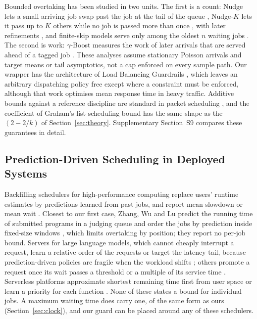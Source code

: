 Bounded overtaking has been studied in two units. The first is a count: Nudge lets a small
arriving job swap past the job at the tail of the queue \cite{grosof2021nudge}, Nudge-$K$
lets it pass up to $K$ others while no job is passed more than once
\cite{vanhoudt2022nudgek}, with later refinements \cite{charlet2026nudgestarm}, and finite-skip models serve only among
the oldest $n$ waiting jobs \cite{grosof2022wcfs}. The second is work: $\gamma$-Boost
measures the work of later arrivals that are served ahead of a tagged job
\cite{yu2024boost,yu2025twotraffics}. These analyses assume stationary Poisson arrivals and
target means or tail asymptotics, not a cap enforced on every sample path. Our wrapper has
the architecture of Load Balancing Guardrails \cite{grosof2019guardrails}, which leaves an
arbitrary dispatching policy free except where a constraint must be enforced, although
that work optimises mean response time in heavy traffic. Additive bounds against a
reference discipline are standard in packet scheduling
\cite{demers1989fq,parekh1993gps,bennett1996wf2q,stoica1995eevdf}, and the coefficient of
Graham's list-scheduling bound \cite{graham1969bounds} has the same shape as the $(2-2/k)$
of Section~\ref{sec:theory}. Supplementary Section~S9 compares these guarantees in detail.

\subsection{Prediction-Driven Scheduling in Deployed Systems}

Backfilling schedulers for high-performance computing replace users' runtime estimates by
predictions learned from past jobs, and report mean slowdown or mean wait
\cite{tsafrir2007backfilling,gaussier2015backfilling,gaussier2018easytuning}. Closest to our
first case, Zhang, Wu and Lu predict the running time of submitted programs in a judging
queue and order the jobs by prediction inside fixed-size windows
\cite{zhang2024ojscheduling}, which limits overtaking by position; they report no per-job
bound. Servers for large language models, which cannot cheaply interrupt a request, learn a
relative order of the requests \cite{fu2024ltr} or target the latency tail, because
prediction-driven policies are fragile when the workload shifts \cite{li2026tailaware};
others promote a request once its wait passes a threshold \cite{wu2023fastserve} or a
multiple of its service time \cite{luo2025autellix}. Serverless platforms approximate
shortest remaining time first from user space \cite{fu2022sfs} or learn a priority for
each function \cite{fu2024alps}. None of these states a bound for individual jobs. A
maximum waiting time does carry one, of the same form as ours
(Section~\ref{sec:clock}), and our guard can be placed around any of these schedulers.

